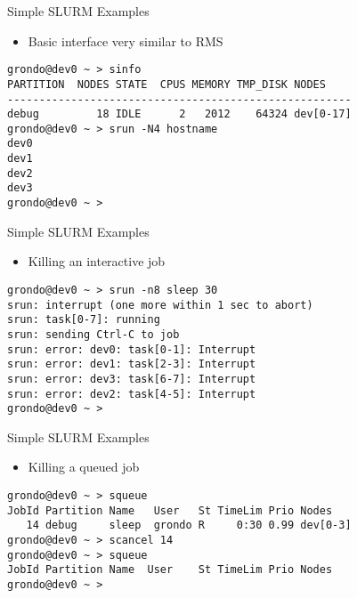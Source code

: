 \documentclass[%
letterpaper,
pdf,
slideColor,
alienglow
]{prosper}
\begin{document}
%
%
\begin{slide}{Simple SLURM Examples}
\begin{itemize}
\item Basic interface very similar to RMS
\end{itemize}
\renewcommand{\baselinestretch}{0.8}
\footnotesize
\begin{verbatim}
grondo@dev0 ~ > sinfo
PARTITION  NODES STATE  CPUS MEMORY TMP_DISK NODES
------------------------------------------------------
debug         18 IDLE      2   2012    64324 dev[0-17]
grondo@dev0 ~ > srun -N4 hostname
dev0
dev1
dev2
dev3
grondo@dev0 ~ >
\end{verbatim}
\renewcommand{\baselinestretch}{1.0}
\end{slide}

%
%
\begin{slide}{Simple SLURM Examples}
\begin{itemize}
\item Killing an interactive job
\end{itemize}
\renewcommand{\baselinestretch}{0.8}
\footnotesize
\begin{verbatim}
grondo@dev0 ~ > srun -n8 sleep 30
srun: interrupt (one more within 1 sec to abort)
srun: task[0-7]: running
srun: sending Ctrl-C to job
srun: error: dev0: task[0-1]: Interrupt
srun: error: dev1: task[2-3]: Interrupt
srun: error: dev3: task[6-7]: Interrupt
srun: error: dev2: task[4-5]: Interrupt
grondo@dev0 ~ >
\end{verbatim}
\renewcommand{\baselinestretch}{1.0}
\end{slide}

%
%
\begin{slide}{Simple SLURM Examples}
\begin{itemize}
\item Killing a queued job
\end{itemize}
\renewcommand{\baselinestretch}{0.8}
\footnotesize
\begin{verbatim}
grondo@dev0 ~ > squeue
JobId Partition Name   User   St TimeLim Prio Nodes
   14 debug     sleep  grondo R     0:30 0.99 dev[0-3]
grondo@dev0 ~ > scancel 14
grondo@dev0 ~ > squeue
JobId Partition Name  User    St TimeLim Prio Nodes
grondo@dev0 ~ >
\end{verbatim}
\renewcommand{\baselinestretch}{1.0}
\end{slide}
\end{document}
